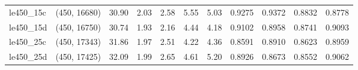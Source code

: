 \begin{tabular}{llrrrrrrrrr}
 le450\_15c & (450, 16680) & 30.90 & 2.03 & 2.58 &  5.55 &   5.03 &   0.9275 &   0.9372 &     0.8832 &      0.8778 \\
 le450\_15d & (450, 16750) & 30.74 & 1.93 & 2.16 &  4.44 &   4.18 &   0.9102 &   0.8958 &     0.8741 &      0.9093 \\
 le450\_25c & (450, 17343) & 31.86 & 1.97 & 2.51 &  4.22 &   4.36 &   0.8591 &   0.8910 &     0.8623 &      0.8959 \\
 le450\_25d & (450, 17425) & 32.09 & 1.99 & 2.65 &  4.61 &   5.20 &   0.8926 &   0.8673 &     0.8552 &      0.9062 \\
\bottomrule
\end{tabular}
